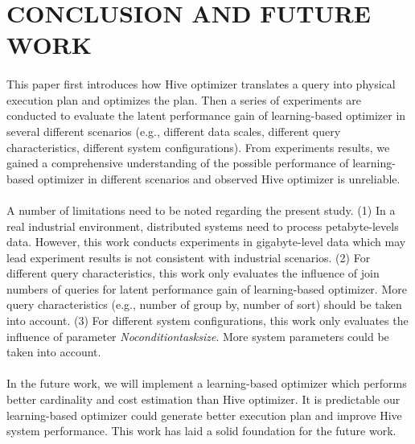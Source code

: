 \section{CONCLUSION AND FUTURE WORK}
    \paragraph{}
    This paper first introduces how Hive optimizer translates a query into physical execution plan and optimizes the plan. Then a series of experiments are conducted 
    to evaluate the latent performance gain of learning-based optimizer in several different scenarios (e.g., different data scales, different query characteristics, 
    different system configurations). From experiments results, we gained a comprehensive understanding of the possible performance of learning-based optimizer in 
    different scenarios and observed Hive optimizer is unreliable. 
    \paragraph{}
    A number of limitations need to be noted regarding the present study.
    \newline
    (1) In a real industrial environment, distributed systems need to process petabyte-levels data. However, this work conducts experiments in gigabyte-level data which
    may lead experiment results is not consistent with industrial scenarios. 
    \newline
    (2) For different query characteristics, this work only evaluates the influence of join numbers of queries for latent performance gain of learning-based optimizer. 
    More query characteristics (e.g., number of group by, number of sort) should be taken into account.
    \newline
    (3) For different system configurations, this work only evaluates the influence of parameter \textit{Noconditiontasksize}. More system parameters could be taken into 
    account. 
    \paragraph{}
    In the future work, we will implement a learning-based optimizer which performs better cardinality and cost estimation than Hive optimizer. It is predictable
    our learning-based optimizer could generate better execution plan and improve Hive system performance. This work has laid a solid foundation for the future work.
    